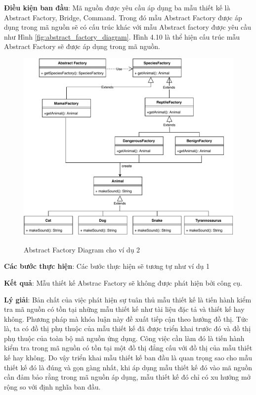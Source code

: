 \documentclass[12pt]{report}
\begin{document}
\noindent \textbf{Điều kiện ban đầu}: Mã nguồn được yêu cầu áp dụng ba mẫu thiết kế là Abstract Factory, Bridge, Command. Trong đó mẫu Abstract Factory được áp dụng trong mã nguồn sẽ có cấu trúc khác với mẫu Abstract factory được yêu cầu như Hình \ref{fig:abstract_factory_diagram}. Hình 4.10 là thể hiện cấu trúc mẫu Abstract Factory sẽ được áp dụng trong mã nguồn.
\begin{figure}[h]
	\centering
	\includegraphics[scale=.8]{images/_abstract_factory_2.pdf}
	\label{fig:abstract_factory_diaram_2}
	\caption{Abstract Factory Diagram cho ví dụ 2}
\end{figure}

\noindent \textbf{Các bước thực hiện}: Các bước thực hiện sẽ tương tự như ví dụ 1 

\noindent \textbf{Kết quả}: Mẫu thiết kế Abstrac Factory sẽ không được phát hiện bởi công cụ.

\noindent \textbf{Lý giải}: Bản chất của việc phát hiện sự tuân thủ mẫu thiết kế là tiến hành kiểm tra mã nguồn có tồn tại những mẫu thiết kế như tài liệu đặc tả và thiết kế hay không. Phương pháp mà khóa luận này đề xuất tiếp cận theo hướng đồ thị. Tức là, ta có đồ thị phụ thuộc của mẫu thiết kế đã được triển khai trước đó và đồ thị phụ thuộc của toàn bộ mã nguồn ứng dụng. Công việc cần làm đó là tiến hành kiểm tra trong mã nguồn có tồn tại một đồ thị đẳng cấu với đồ thị của mẫu thiết kế hay không.
Do vậy triển khai mẫu thiết kế ban đầu là quan trọng sao cho mẫu thiết kế đó là đúng và gọn gàng nhất, khi áp dụng mẫu thiết kế đó vào mã nguồn cần đảm bảo rằng trong mã nguồn áp dụng, mẫu thiết kế đó chỉ có xu hướng mở rộng so với định nghĩa ban đầu.
\end{document}
